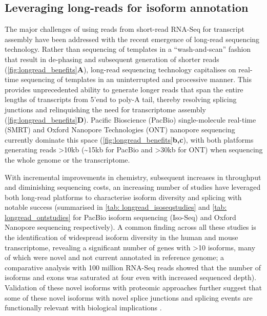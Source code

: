\subsection{Leveraging long-reads for isoform annotation}
The major challenges of using reads from short-read RNA-Seq for transcript assembly have been addressed with the recent emergence of long-read sequencing technology. Rather than sequencing of templates in a “wash-and-scan” fashion that result in de-phasing and subsequent generation of shorter reads (\cref{fig:longread_benefits}\textbf{A}), long-read sequencing technology capitalises on real-time sequencing of templates in an uninterrupted and processive manner. This provides unprecedented ability to generate longer reads that span the entire lengths of transcripts from 5'end to poly-A tail, thereby resolving splicing junctions and relinquishing the need for transcriptome assembly (\cref{fig:longread_benefits}\textbf{D}). Pacific Bioscience (PacBio) single-molecule real-time (SMRT) and Oxford Nanopore Technologies (ONT) nanopore sequencing currently dominate this space (\cref{fig:longread_benefits}\textbf{b,c}), with both platforms generating reads >10kb (\textasciitilde15kb for PacBio and >30kb for ONT) when sequencing the whole genome or the transcriptome.  

With incremental improvements in chemistry, subsequent increases in throughput and diminishing sequencing costs, an increasing number of studies have leveraged both long-read platforms to characterise isoform diversity and splicing with notable success (summarised in \cref{tab: longread_isoseqstudies} and \cref{tab: longread_ontstudies} for PacBio isoform sequencing (Iso-Seq) and Oxford Nanopore sequencing respectively). A common finding across all these studies is the identification of widespread isoform diversity in the human \cite{Sharon2013, Au2013,Tseng2019,DeslattesMays2019} and mouse transcriptome, revealing a significant number of genes with >10 isoforms, many of which were novel and not current annotated in reference genome; a comparative analysis with 100 million RNA-Seq reads showed that the number of isoforms and exons was saturated at four even with increased sequenced depth\cite{DeslattesMays2019}). Validation of these novel isoforms with proteomic approaches further suggest that some of these novel isoforms with novel splice junctions and splicing events are functionally relevant with biological implications \cite{Huang2021}. 


